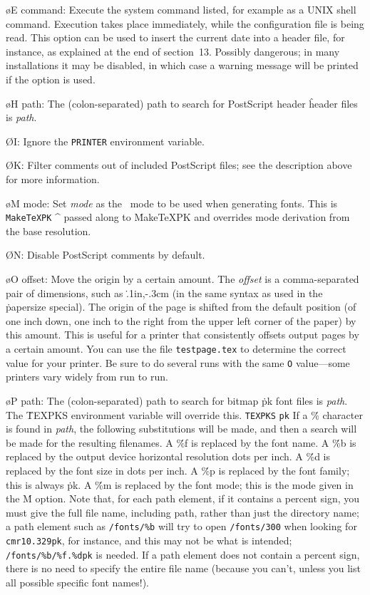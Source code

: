 {\o E command:
Execute the system command listed, for example as a UNIX shell command.
Execution takes place immediately, while the configuration file is
being read. This option can be used to insert the current date into a
header file, for instance, as explained at the end
of section~13.	Possibly dangerous; in many
installations it may be disabled, in which case a warning message will
be printed if the option is used.

\o H path:
The (colon-separated) path to search for PostScript header
\^{header}
files is {\it path}.

\O I:
Ignore the {\tt PRINTER} environment variable.

\O K:
Filter comments out of included PostScript files; see the description
above for more information.

\o M mode: Set {\it mode}
as the \MF\ mode to be used when generating fonts.  This is
\^{{\tt MakeTeXPK}}
\^{{\MF}}
passed along to \.{MakeTeXPK} and overrides mode derivation from the
base resolution.

\O N:  Disable PostScript comments by default.

\o O offset:
Move the origin by a certain amount.  The {\it offset} is a comma-separated
pair of dimensions, such as \.{.1in,-.3cm} (in the same syntax as used in
the \.{papersize} special).   The origin of the page is shifted from the
default position (of one inch down, one inch to the right from the upper
left corner of the paper) by this amount.
This is useful for a printer that consistently offsets output pages by a
certain amount. You can use the file {\tt testpage.tex} to determine
the correct value for your printer. Be sure to do several runs with the
same {\tt O} value---some printers vary widely from run to run.

\o P path:  The (colon-separated) path to search for bitmap \.{pk}
font files is
{\it path}.  The \.{TEXPKS} environment variable will override this.
\^{{\tt TEXPKS}}
\^{{\tt pk}}
If a \.{\%} character is found in {\it path},
the following substitutions will be made, and then a search will
be made for the resulting filenames.
A \.{\%f} is replaced by the font name.
A \.{\%b} is replaced by the output device horizontal resolution dots per inch.
A \.{\%d} is replaced by the font size in dots per inch.
A \.{\%p} is replaced by the font family; this is always \.{pk}.
A \.{\%m} is replaced by the font mode; this is the mode given
in the \.{M} option.
Note that, for each path element, if it contains a percent sign, you
must give the full file name, including path, rather than just the
directory name; a path element such as {\tt /fonts/\%b} will try to
open {\tt /fonts/300} when looking for {\tt cmr10.329pk}, for
instance, and this may not be what is intended; {\tt /fonts/\%b/\%f.\%dpk}
is needed.  If a path element does not contain a percent sign, there
is no need to specify the entire file name (because you can't, unless
you list all possible specific font names!).

}
